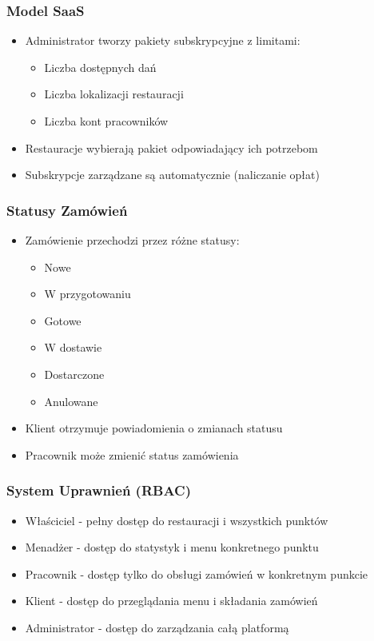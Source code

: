 \documentclass[12pt,a4paper,utf-8]{article}
\begin{document}
\subsubsection{Model SaaS}

\begin{itemize}
    \item Administrator tworzy pakiety subskrypcyjne z limitami:
    \begin{itemize}
        \item Liczba dostępnych dań
        \item Liczba lokalizacji restauracji
        \item Liczba kont pracowników
    \end{itemize}
    \item Restauracje wybierają pakiet odpowiadający ich potrzebom
    \item Subskrypcje zarządzane są automatycznie (naliczanie opłat)
\end{itemize}

\subsubsection{Statusy Zamówień}

\begin{itemize}
    \item Zamówienie przechodzi przez różne statusy:
    \begin{itemize}
        \item Nowe
        \item W przygotowaniu
        \item Gotowe
        \item W dostawie
        \item Dostarczone
        \item Anulowane
    \end{itemize}
    \item Klient otrzymuje powiadomienia o zmianach statusu
    \item Pracownik może zmienić status zamówienia
\end{itemize}

\subsubsection{System Uprawnień (RBAC)}

\begin{itemize}
    \item Właściciel - pełny dostęp do restauracji i wszystkich punktów
    \item Menadżer - dostęp do statystyk i menu konkretnego punktu
    \item Pracownik - dostęp tylko do obsługi zamówień w konkretnym punkcie
    \item Klient - dostęp do przeglądania menu i składania zamówień
    \item Administrator - dostęp do zarządzania całą platformą
\end{itemize}
\end{document}
